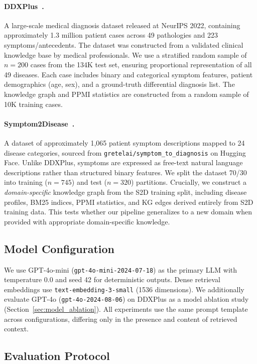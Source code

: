 \documentclass[review]{elsarticle}
\begin{document}
\paragraph{DDXPlus~\cite{fansi2022ddxplus}.} A large-scale medical diagnosis dataset released at NeurIPS 2022, containing approximately 1.3 million patient cases across 49 pathologies and 223 symptoms/antecedents. The dataset was constructed from a validated clinical knowledge base by medical professionals. We use a stratified random sample of $n{=}200$ cases from the 134K test set, ensuring proportional representation of all 49 diseases. Each case includes binary and categorical symptom features, patient demographics (age, sex), and a ground-truth differential diagnosis list. The knowledge graph and PPMI statistics are constructed from a random sample of 10K training cases.

\paragraph{Symptom2Disease~\cite{gretelai_s2d}.} A dataset of approximately 1{,}065 patient symptom descriptions mapped to 24 disease categories, sourced from \texttt{gretelai/symptom\_to\_diagnosis} on Hugging Face. Unlike DDXPlus, symptoms are expressed as free-text natural language descriptions rather than structured binary features. We split the dataset 70/30 into training ($n{=}745$) and test ($n{=}320$) partitions. Crucially, we construct a \emph{domain-specific} knowledge graph from the S2D training split, including disease profiles, BM25 indices, PPMI statistics, and KG edges derived entirely from S2D training data. This tests whether our pipeline generalizes to a new domain when provided with appropriate domain-specific knowledge.

\subsection{Model Configuration}

We use GPT-4o-mini (\texttt{gpt-4o-mini-2024-07-18}) as the primary LLM with temperature 0.0 and seed 42 for deterministic outputs. Dense retrieval embeddings use \texttt{text-embedding-3-small} (1536 dimensions). We additionally evaluate GPT-4o (\texttt{gpt-4o-2024-08-06}) on DDXPlus as a model ablation study (Section~\ref{sec:model_ablation}). All experiments use the same prompt template across configurations, differing only in the presence and content of retrieved context.

\subsection{Evaluation Protocol}
\end{document}
